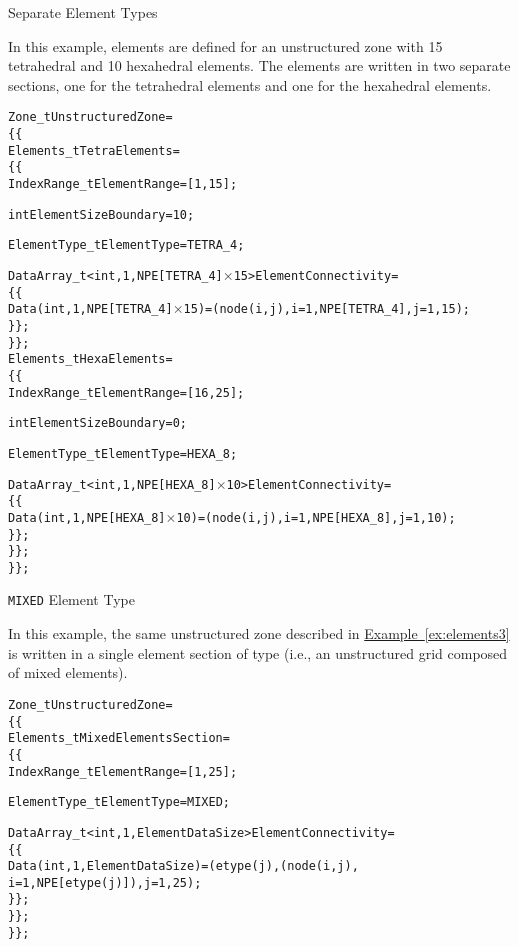 \begin{example}{Separate Element Types}
\label{ex:elements3}

In this example, elements are defined for an unstructured zone with 15
tetrahedral and 10 hexahedral elements.
The elements are written in two separate sections, one for the
tetrahedral elements and one for the hexahedral elements.
\begin{alltt}
  Zone\_t UnstructuredZone =
    \{\{
    Elements\_t TetraElements =
      \{\{
      IndexRange\_t ElementRange = [1,15] ;

      int ElementSizeBoundary = 10 ;

      ElementType\_t ElementType = TETRA\_4 ;

      DataArray\_t<int, 1, NPE[TETRA\_4]\(\times\)15> ElementConnectivity =
        \{\{
        Data(int, 1, NPE[TETRA\_4]\(\times\)15) = (node(i,j), i=1,NPE[TETRA\_4], j=1,15) ;
        \}\} ;
      \}\} ;
    Elements\_t HexaElements =
      \{\{
      IndexRange\_t ElementRange = [16,25] ;

      int ElementSizeBoundary = 0 ;

      ElementType\_t ElementType = HEXA\_8 ;

      DataArray\_t<int, 1, NPE[HEXA\_8]\(\times\)10> ElementConnectivity =
        \{\{
        Data(int, 1, NPE[HEXA\_8]\(\times\)10) = (node(i,j), i=1,NPE[HEXA\_8], j=1,10) ;
        \}\} ;
      \}\} ;
    \}\} ;
\end{alltt}
\end{example}

\begin{example}{\texttt{MIXED} Element Type}
\label{ex:elements4}

In this example, the same unstructured zone described in 
\hyperref[ex:elements3]{Example~\ref*{ex:elements3}} is written in a
single element section of type  (i.e., an unstructured grid
composed of mixed elements).
\begin{alltt}
  Zone\_t UnstructuredZone =
    \{\{
    Elements\_t MixedElementsSection =
      \{\{
      IndexRange\_t ElementRange = [1,25] ;

      ElementType\_t ElementType = MIXED ;

      DataArray\_t<int, 1, ElementDataSize> ElementConnectivity =
        \{\{
        Data(int, 1, ElementDataSize) = (etype(j),(node(i,j),
             i=1,NPE[etype(j)]), j=1,25) ;
        \}\} ;
      \}\} ;
    \}\} ;
\end{alltt}
\end{example}

